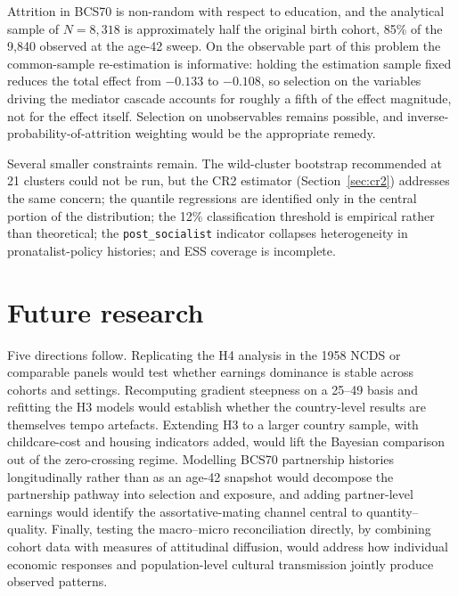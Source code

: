 \documentclass[12pt,a4paper]{report}
\begin{document}
Attrition in BCS70 is non-random with respect to education, and the analytical sample of $N=8{,}318$ is
approximately half the original birth cohort, 85\% of the 9{,}840 observed at the age-42 sweep. On the
observable part of this problem the common-sample re-estimation is informative: holding the estimation
sample fixed reduces the total effect from $-0.133$ to $-0.108$, so selection on the variables driving
the mediator cascade accounts for roughly a fifth of the effect magnitude, not for the effect itself.
Selection on unobservables remains possible, and inverse-probability-of-attrition weighting
\citep{hernan2004} would be the appropriate remedy.

Several smaller constraints remain. The wild-cluster bootstrap recommended at 21 clusters
\citep{cameron2008} could not be run, but the CR2 estimator (Section~\ref{sec:cr2}) addresses the same
concern; the quantile regressions are identified only in the central portion of the distribution; the
12\% classification threshold is empirical rather than theoretical; the \texttt{post\_socialist}
indicator collapses heterogeneity in pronatalist-policy histories; and ESS coverage is incomplete.

\section{Future research}
Five directions follow. Replicating the H4 analysis in the 1958 NCDS or comparable panels would test
whether earnings dominance is stable across cohorts and settings. Recomputing gradient steepness on a
25--49 basis and refitting the H3 models would establish whether the country-level results are
themselves tempo artefacts. Extending H3 to a larger country sample, with childcare-cost and housing
indicators added, would lift the Bayesian comparison out of the zero-crossing regime. Modelling BCS70
partnership histories longitudinally rather than as an age-42 snapshot would decompose the partnership
pathway into selection and exposure, and adding partner-level earnings would identify the
assortative-mating channel central to quantity--quality. Finally, testing the macro--micro
reconciliation directly, by combining cohort data with measures of attitudinal diffusion, would address
how individual economic responses and population-level cultural transmission jointly produce observed
patterns.

\end{document}
